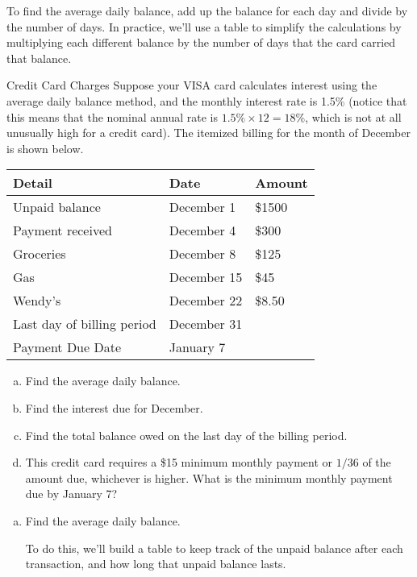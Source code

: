 To find the average daily balance, add up the balance for each day and divide by the number of days.  In practice, we'll use a table to simplify the calculations by multiplying each different balance by the number of days that the card carried that balance.

\begin{example}[https://www.youtube.com/watch?v=ZUEQu_e2TqY&list=PLfmpjsIzhztsZtnb7HnXrQ8SLoiOCIcAM&index=42]{Credit Card Charges}
Suppose your VISA card calculates interest using the average daily balance method, and the monthly interest rate is 1.5\% (notice that this means that the nominal annual rate is $1.5\% \times 12 = 18\%$, which is not at all unusually high for a credit card).  The itemized billing for the month of December is shown below.
\begin{center}
\begin{tabular}{l l l}
Detail & Date & Amount\\
\hline
Unpaid balance & December 1 & \$1500\\
Payment received & December 4 & \$300\\
Groceries & December 8 & \$125\\
Gas & December 15 & \$45\\
Wendy's & December 22 & \$8.50\\
Last day of billing period & December 31 &\\
Payment Due Date & January 7 &\\
\end{tabular}
\end{center}

\begin{enumerate}[(a)]
\item Find the average daily balance.
\item Find the interest due for December.
\item Find the total balance owed on the last day of the billing period.
\item This credit card requires a \$15 minimum monthly payment or $1/36$ of the amount due, whichever is higher.  What is the minimum monthly payment due by January 7?
\end{enumerate}

\sol
\begin{enumerate}[(a)]
\item Find the average daily balance.

To do this, we'll build a table to keep track of the unpaid balance after each transaction, and how long that unpaid balance lasts.


\end{enumerate}
\end{example}

